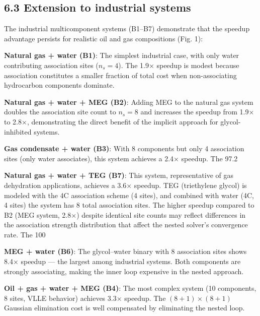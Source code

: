 \documentclass[review,3p]{elsarticle}
\begin{document}
\subsection{6.3 Extension to industrial systems}

The industrial multicomponent systems (B1–B7) demonstrate that the speedup advantage persists for realistic oil and gas compositions (Fig. 1):

\textbf{Natural gas + water (B1)}: The simplest industrial case, with only water contributing association sites ($n_s = 4$). The 1.9× speedup is modest because association constitutes a smaller fraction of total cost when non-associating hydrocarbon components dominate.

\textbf{Natural gas + water + MEG (B2)}: Adding MEG to the natural gas system doubles the association site count to $n_s = 8$ and increases the speedup from 1.9× to 2.8×, demonstrating the direct benefit of the implicit approach for glycol-inhibited systems.

\textbf{Gas condensate + water (B3)}: With 8 components but only 4 association sites (only water associates), this system achieves a 2.4× speedup. The 97.2%

\textbf{Natural gas + water + TEG (B7)}: This system, representative of gas dehydration applications, achieves a 3.6× speedup. TEG (triethylene glycol) is modeled with the 4C association scheme (4 sites), and combined with water (4C, 4 sites) the system has 8 total association sites. The higher speedup compared to B2 (MEG system, 2.8×) despite identical site counts may reflect differences in the association strength distribution that affect the nested solver's convergence rate. The 100%

\textbf{MEG + water (B6)}: The glycol–water binary with 8 association sites shows 8.4× speedup — the largest among industrial systems. Both components are strongly associating, making the inner loop expensive in the nested approach.

\textbf{Oil + gas + water + MEG (B4)}: The most complex system (10 components, 8 sites, VLLE behavior) achieves 3.3× speedup. The $(8+1) \times (8+1)$ Gaussian elimination cost is well compensated by eliminating the nested loop.
\end{document}
